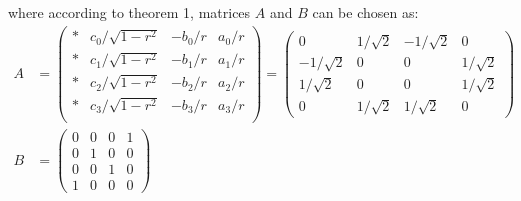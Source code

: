 \documentclass[10pt,letterpaper]{article} %
\begin{document}
\begin{itemize}
where according to theorem 1, matrices $A$ and $B$ can be chosen as:
\begin{eqnarray}
A &= \begin{pmatrix}
*  & c_0 / \sqrt{1-r^2} & -b_0/r & a_0 /r \\
*  & c_1 / \sqrt{1-r^2} & -b_1/r & a_1 /r \\ 
* & c_2 / \sqrt{1-r^2} & -b_2/r & a_2/r \\
* & c_3 / \sqrt{1-r^2} & -b_3/r & a_3/r \\
\end{pmatrix} = \begin{pmatrix}
0 & 1/\sqrt{2} & -1/\sqrt{2} & 0 \\
-1/\sqrt{2} & 0 & 0 & 1/\sqrt{2} \\
1/\sqrt{2} & 0 & 0 & 1/\sqrt{2} \\
0 & 1/\sqrt{2} & 1/\sqrt{2} & 0
\end{pmatrix} \\
B& = \begin{pmatrix}
0 & 0 & 0 & 1 \\
0 & 1 & 0 & 0\\
0 & 0& 1 & 0 \\
1 & 0 & 0 & 0 
\end{pmatrix}
\end{eqnarray}
\end{itemize}

\end{document}
